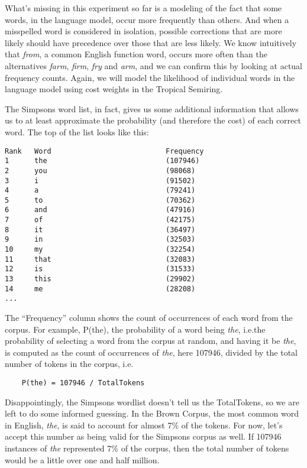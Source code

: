 What's missing in this experiment so far is a modeling of the fact that some
words, in the language model, occur more frequently than others.  And when a
misspelled word is considered in isolation, possible corrections that are more
likely should have precedence over those that are less likely.  We
know intuitively that \emph{from}, a common English function word, occurs more often than the
alternatives \emph{farm}, \emph{firm}, \emph{fry} and \emph{arm},  and we can confirm this by looking at actual frequency counts.  Again, we will
model the likelihood of individual words in the language model using cost weights in the Tropical Semiring.


The Simpsons word list, in fact, gives us some additional information that allows
us to at least approximate the probability (and therefore the cost) of each
correct word.  The top of the list looks like this:

\begin{Verbatim}
Rank   Word                           Frequency
1      the                            (107946)
2      you                            (98068)
3      i                              (91502)
4      a                              (79241)
5      to                             (70362)
6      and                            (47916)
7      of                             (42175)
8      it                             (36497)
9      in                             (32503)
10     my                             (32254)
11     that                           (32083)
12     is                             (31533)
13     this                           (29902)
14     me                             (28208)
...
\end{Verbatim}

\noindent
The ``Frequency'' column shows the count of occurrences of each word from the
corpus.  For example, P(the), the probability of a word being \emph{the}, i.e.\@ the probability of
selecting a word from the corpus at random, and having it be \emph{the}, is
computed as the count of occurrences of \emph{the}, here 107946, divided by the
total number of tokens in the corpus, i.e.\@

\begin{Verbatim}
	P(the) = 107946 / TotalTokens
\end{Verbatim}

\noindent
Disappointingly, the Simpsons wordlist doesn't tell us the TotalTokens,
so we are left to do some informed guessing.  In the Brown Corpus, the
most common word in English, 
\emph{the}, is said to account for almost 7\% of the tokens.  For now, let's accept
this number as being valid for the Simpsons corpus as well.  If 107946 instances of \emph{the}
represented 7\% of the corpus, then the total number of tokens would be a little over one and half
million.

